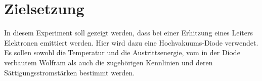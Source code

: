 
\section{Zielsetzung}
\label{sec:Zielsetzung}
 In diesem Experiment soll gezeigt werden, dass bei einer Erhitzung eines Leiters Elektronen emittiert werden. Hier wird dazu eine Hochvakuums-Diode verwendet. Es sollen sowohl die Temperatur und die Austrittsenergie, vom in der Diode verbautem Wolfram als auch die zugehörigen Kennlinien und deren Sättigungsstromstärken bestimmt werden.